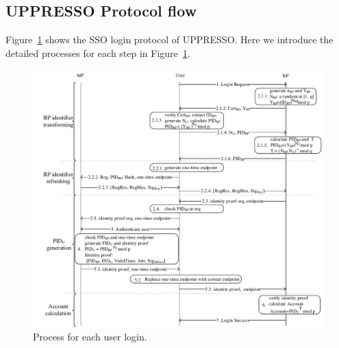 \subsection{UPPRESSO Protocol flow}
\label{sebsec:loginprocess}
Figure~\ref{fig:process} shows the SSO login protocol of UPPRESSO. %
Here we introduce the detailed processes for each step in Figure~\ref{fig:process}.

\begin{figure}
  \centering
  \includegraphics[width=0.85\linewidth]{fig/process.pdf}
  \caption{Process for each user login.}
  \label{fig:process}
\end{figure}

